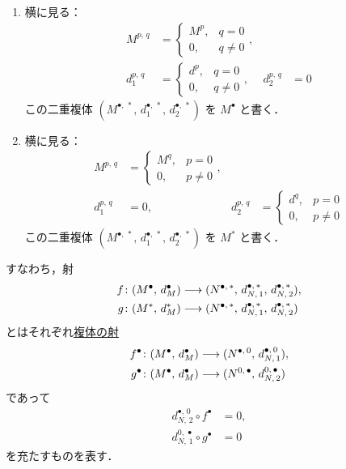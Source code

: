 \documentclass[algtopo_main]{subfiles}
\begin{document}
\begin{enumerate}
    \item 横に見る：
    \begin{align}
        M^{p,\, q} &= 
        \begin{cases}
            M^p, &q = 0 \\
            0, &q \neq 0 
        \end{cases}, & & \\
        d_1^{p,\, q} &=
        \begin{cases}
            d^p, &q=0 \\
            0, &q \neq 0
        \end{cases}, &
        d_2^{p,\, q} &= 0
    \end{align}
    この二重複体 $(M^{\bullet,\, *},\, d_1^{\bullet,\, *},\, d_2^{\bullet,\, *})$ を $M^\bullet$ と書く．
    \item 横に見る：
    \begin{align}
        M^{p,\, q} &= 
        \begin{cases}
            M^q, &p = 0 \\
            0, &p \neq 0 
        \end{cases}, & & \\
        d_1^{p,\, q} &= 0, &
        d_2^{p,\, q} &=
        \begin{cases}
            d^q, &p=0 \\
            0, &p \neq 0
        \end{cases}
    \end{align}
    この二重複体 $(M^{\bullet,\, *},\, d_1^{\bullet,\, *},\, d_2^{\bullet,\, *})$ を $M^*$ と書く．
\end{enumerate}
すなわち，射
\begin{align}
    f &\colon (M^\bullet,\, d_M^\bullet) \longrightarrow (N^{\bullet,\, *},\, d_{N,\, 1}^{\bullet,\, *},\, d_{N,\,2}^{\bullet,\, *}), \\
    g &\colon (M^*,\, d_M^*) \longrightarrow (N^{\bullet,\, *},\, d_{N,\, 1}^{\bullet,\, *},\, d_{N,\,2}^{\bullet,\, *})
\end{align}
とはそれぞれ\hyperref[def:chain-morphism]{複体の射}
\begin{align}
    f^\bullet &\colon (M^\bullet,\, d_M^\bullet) \longrightarrow (N^{\bullet,\, 0},\, d_{N,\, 1}^{\bullet,\, 0}), \\
    g^\bullet &\colon (M^\bullet,\, d_M^\bullet) \longrightarrow (N^{0,\, \bullet},\, d_{N,\,2}^{0,\, \bullet})
\end{align}
であって
\begin{align}
    d_{N,\, 2}^{\bullet,\, 0} \circ f^\bullet &= 0, \\
    d_{N,\, 1}^{0,\, \bullet} \circ g^\bullet &= 0
\end{align}
を充たすものを表す．
\end{document}
